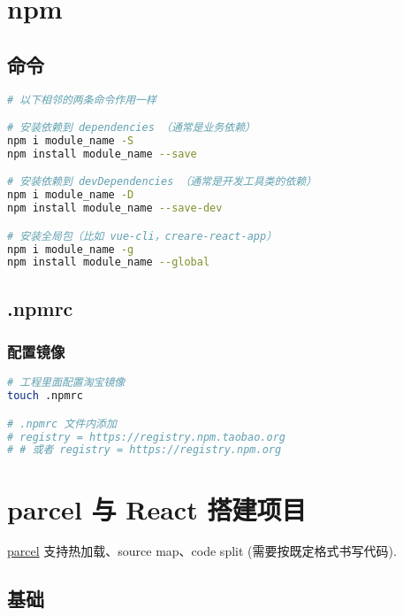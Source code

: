 \section{npm}\label{npm}

\subsection{命令}\label{ux547dux4ee4}

\begin{lstlisting}[language=bash]
# 以下相邻的两条命令作用一样

# 安装依赖到 dependencies （通常是业务依赖）
npm i module_name -S
npm install module_name --save

# 安装依赖到 devDependencies （通常是开发工具类的依赖）
npm i module_name -D
npm install module_name --save-dev

# 安装全局包（比如 vue-cli，creare-react-app）
npm i module_name -g
npm install module_name --global
\end{lstlisting}

\subsection{.npmrc}\label{npmrc}

\subsubsection{配置镜像}\label{ux914dux7f6eux955cux50cf}

\begin{lstlisting}[language=bash]
# 工程里面配置淘宝镜像
touch .npmrc

# .npmrc 文件内添加
# registry = https://registry.npm.taobao.org
# # 或者 registry = https://registry.npm.org
\end{lstlisting}

\section{parcel 与 React
搭建项目}\label{parcel-ux4e0e-react-ux642dux5efaux9879ux76ee}

\href{https://github.com/parcel-bundler/parcel}{parcel}
支持热加载、source map、code split (需要按既定格式书写代码).

\subsection{基础}\label{ux57faux7840}

